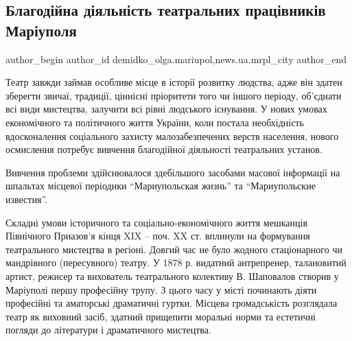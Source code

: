  
 
 
 
 
 
\subsection{Благодійна діяльність театральних працівників Маріуполя}
\label{sec:13_11_2018.stz.news.ua.mrpl_city.1.blagodijna_dijalnist_teatr_pracivnyk_mrpl}
 
\ifcmt
 author_begin
   author_id demidko_olga.mariupol,news.ua.mrpl_city
 author_end
\fi

Театр завжди займав особливе місце в історії розвитку людства, адже він здатен
зберегти звичаї, традиції, ціннісні пріоритети того чи іншого періоду,
об'єднати всі види мистецтва, залучити всі рівні людського існування. У нових
умовах економічного та політичного життя України, коли постала необхідність
вдосконалення соціального захисту малозабезпечених верств населення, нового
осмислення потребує вивчення благодійної діяльності театральних установ.


Вивчення проблеми здійснювалося здебільшого засобами масової інформації на
шпальтах місцевої періодики \enquote{Мариупольская жизнь} та \enquote{Мариупольские известия}.

Складні умови історичного та соціально-економічного життя мешканців Північного
Приазов'я кінця XIX – поч. XX ст. вплинули на формування театрального мистецтва
в регіоні. Довгий час не було жодного стаціонарного чи мандрівного
(пересувного) театру. У 1878 р. видатний антрепренер, талановитий артист,
режисер та вихователь театрального колективу В. Шаповалов створив у Маріуполі
першу професійну трупу. З цього часу у місті починають діяти професійні та
аматорські драматичні гуртки. Місцева громадськість розглядала театр як
виховний засіб, здатний прищепити моральні норми та естетичні погляди до
літератури і драматичного мистецтва.

